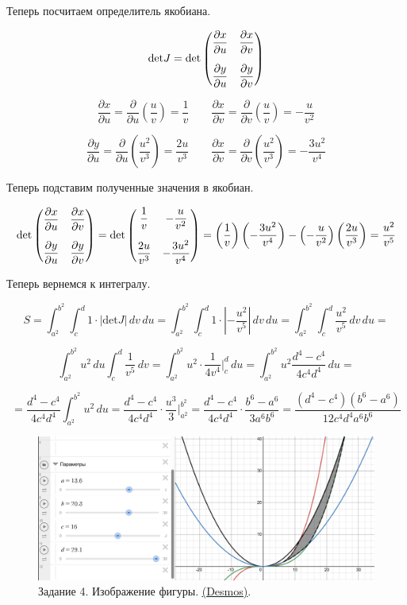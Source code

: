 Теперь посчитаем определитель якобиана.

$$\text{det}J = \text{det}\begin{pmatrix}
    \dfrac{\partial x}{\partial u} & \dfrac{\partial x}{\partial v} \vspace{1em}\\
    \dfrac{\partial y}{\partial u} & \dfrac{\partial y}{\partial v} 
\end{pmatrix}$$

$$\dfrac{\partial x}{\partial u} = \dfrac{\partial}{\partial u}\left(\dfrac{u}{v}\right) = \dfrac{1}{v} \quad\quad \dfrac{\partial x}{\partial v} = \dfrac{\partial}{\partial v}\left(\dfrac{u}{v}\right) = -\dfrac{u}{v^2}$$

$$\dfrac{\partial y}{\partial u} = \dfrac{\partial}{\partial u}\left( \dfrac{u^2}{v^3}\right) = \dfrac{2u}{v^3} \quad\quad \dfrac{\partial x}{\partial v} = \dfrac{\partial}{\partial v}\left(\dfrac{u^2}{v^3}\right) = -\dfrac{3u^2}{v^4}$$

Теперь подставим полученные значения в якобиан.

$$\text{det}\begin{pmatrix}
    \dfrac{\partial x}{\partial u} & \dfrac{\partial x}{\partial v} \vspace{1em}\\
    \dfrac{\partial y}{\partial u} & \dfrac{\partial y}{\partial v} 
\end{pmatrix} = \text{det}\begin{pmatrix}
    \dfrac{1}{v} & -\dfrac{u}{v^2} \vspace{1em}\\
    \dfrac{2u}{v^3} & -\dfrac{3u^2}{v^4}
\end{pmatrix} = \left( \frac{1}{v} \right) \left( -\frac{3u^2}{v^4} \right) - \left( -\frac{u}{v^2} \right) \left( \frac{2u}{v^3} \right) = \dfrac{u^2}{v^5}$$

Теперь вернемся к интегралу.

$$S = \int_{a^2}^{b^2} \int_{c}^{d} 1\cdot \left| \text{det}J\right| \,dv\,du = \int_{a^2}^{b^2} \int_{c}^{d} 1\cdot \left| - \dfrac{u^2}{v^5}\right| \,dv\,du = \int_{a^2}^{b^2} \int_{c}^{d} \dfrac{u^2}{v^5} \,dv\,du = $$

$$\int_{a^2}^{b^2} u^2 \,du\int_{c}^{d} \dfrac{1}{v^5} \,dv = \int_{a^2}^{b^2} u^2 \cdot \dfrac{1}{4v^4}\bigg|_{c}^d \,du = \int_{a^2}^{b^2} u^2 \dfrac{d^4 - c^4}{4c^4d^4} \,du = $$

$$= \dfrac{d^4 - c^4}{4c^4d^4} \int_{a^2}^{b^2} u^2 \,du = \dfrac{d^4 - c^4}{4c^4d^4} \cdot \dfrac{u^3}{3} \bigg|_{a^2}^{b^2} = \dfrac{d^4 - c^4}{4c^4d^4} \cdot \dfrac{b^6 - a^6}{3a^6b^6} =\boxed{\dfrac{(d^4 - c^4)(b^6 - a^6)}{12c^4d^4a^6b^6}}$$


\begin{figure}[h!t]
    \centering
    \includegraphics[width=1\linewidth]{Task4/graph.png}
    \caption{Задание 4. Изображение фигуры. \underline{\href{https://www.desmos.com/Calculator/5uewytafsp}{(Desmos)}}. }
\end{figure}